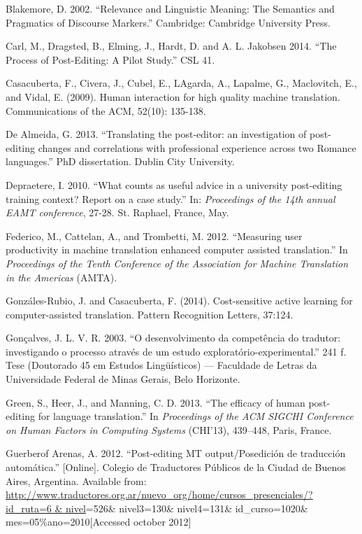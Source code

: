 \documentclass[output=paper]{langsci/langscibook}
\begin{document}
Blakemore, D. 2002. “Relevance and Linguistic Meaning: The Semantics and Pragmatics of Discourse Markers.” Cambridge: Cambridge University Press.



Carl, M., Dragsted, B., Elming, J., Hardt, D. and A. L. Jakobsen 2014. “The Process of Post-Editing: A Pilot Study.” CSL 41.



Casacuberta, F., Civera, J., Cubel, E., LAgarda, A., Lapalme, G., Maclovitch, E., and Vidal, E. (2009). Human interaction for high quality machine translation. Communications of the ACM, 52(10): 135-138.



De Almeida, G. 2013. “Translating the post-editor: an investigation of post-editing changes and correlations with professional experience across two Romance languages.” PhD dissertation. Dublin City University.



Depraetere, I. 2010. “What counts as useful advice in a university post-editing training context? Report on a case study.” In: \textit{Proceedings of the 14th annual EAMT conference}, 27-28. St. Raphael, France, May.



Federico, M., Cattelan, A., and Trombetti, M. 2012. “Measuring user productivity in machine translation enhanced computer assisted translation.” In \textit{Proceedings of the Tenth Conference of the Association for Machine Translation in the Americas} (AMTA).



Gonzáles-Rubio, J. and Casacuberta, F. (2014). Cost-sensitive active learning for computer-assisted translation. Pattern Recognition Letters, 37:124.



Gonçalves, J. L. V. R. 2003. “O desenvolvimento da competência do tradutor: investigando o processo através de um estudo exploratório-experimental.” 241 f. Tese (Doutorado 45 em Estudos Lingüísticos) — Faculdade de Letras da Universidade Federal de Minas Gerais, Belo Horizonte.



Green, S., Heer, J., and Manning, C. D. 2013. “The efficacy of human post-editing for language translation.” In \textit{Proceedings of the ACM SIGCHI Conference on Human Factors in Computing Systems} (CHI’13), 439–448, Paris, France.



Guerberof Arenas, A. 2012. “Post-editing MT output/Posedición de traducción automática.” [Online]. Colegio de Traductores Públicos de la Ciudad de Buenos Aires,\textit{ }Argentina. Available from:\textit{ }\url{http://www.traductores.org.ar/nuevo_org/home/cursos_presenciales/?id_ruta=6 & nivel}=526\& nivel3=130\& nivel4=131\& id\_curso=1020\& mes=05\%ano=2010[Accessed october 2012]
\end{document}

